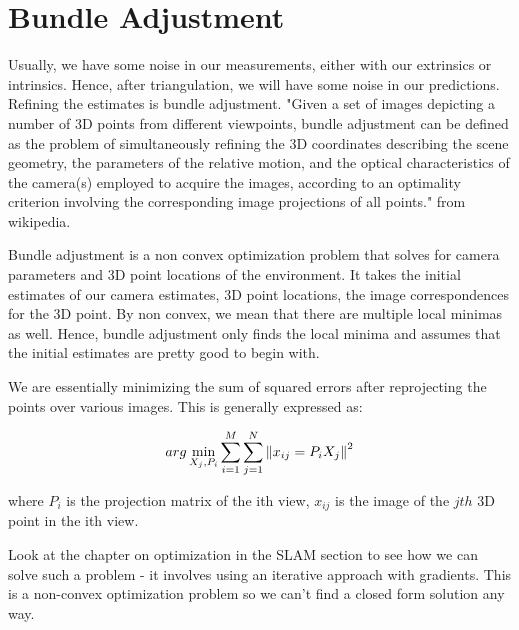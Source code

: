\chapter{Bundle Adjustment}

Usually, we have some noise in our measurements, either with our extrinsics or intrinsics. Hence, after triangulation, we will have some noise in our predictions. Refining the estimates is bundle adjustment. "Given a set of images depicting a number of 3D points from different viewpoints, bundle adjustment can be defined as the problem of simultaneously refining the 3D coordinates describing the scene geometry, the parameters of the relative motion, and the optical characteristics of the camera(s) employed to acquire the images, according to an optimality criterion involving the corresponding image projections of all points." from wikipedia.

Bundle adjustment is a non convex optimization problem that solves for camera parameters and 3D point locations of the environment. It takes the initial estimates of our camera estimates, 3D point locations, the image correspondences for the 3D point. By non convex, we mean that there are multiple local minimas as well. Hence, bundle adjustment only finds the local minima and assumes that the initial estimates are pretty good to begin with.

We are essentially minimizing the sum of squared errors after reprojecting the points over various images. This is generally expressed as:

\begin{equation}
    arg \min_{X_j, P_i} \sum_{i=1}^M\sum_{j=1}^N \left\lVert x_{ij} = P_iX_j\right\rVert^2
\end{equation}

where $P_i$ is the projection matrix of the ith view, $x_{ij}$ is the image of the $jth$ 3D point in the ith view.

Look at the chapter on optimization in the SLAM section to see how we can solve such a problem - it involves using an iterative approach with gradients. This is a non-convex optimization problem so we can't find a closed form solution any way.